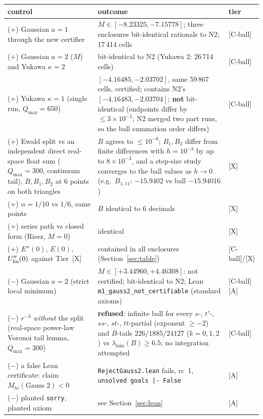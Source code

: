 \documentclass[11pt]{article}
\newcommand{\tier}[1]{\textsf{[#1]}}
\newcommand{\tA}{\tier{A}}
\newcommand{\tCb}{\tier{C-ball}}
\newcommand{\tX}{\tier{X}}
\newcommand{\lean}[1]{\texttt{#1}}
\begin{document}
\begin{center}\small\setlength{\tabcolsep}{3pt}\begin{tabular}{p{4.6cm}p{6.6cm}p{1.5cm}}\toprule
control & outcome & tier\\\midrule
(+) Gaussian $a=1$ through the new certifier & $M\in[-8.23325,-7.15778]$; three enclosures bit-identical rationals to N2; 17\,414 cells & \tCb\\
(+) Gaussian $a=2$ ($M$) and Yukawa $\kappa=2$ & bit-identical to N2 (Yukawa 2: 26\,714 cells) & \tCb\\
(+) Yukawa $\kappa=1$ (single run, $Q_{\max}=650$) & $[-4.16485,-2.03702]$, same 59\,867 cells, certified; contains N2's $[-4.16483,-2.03704]$; \textbf{not} bit-identical (endpoints differ by $\le3\times10^{-5}$; N2 merged two part runs, so the ball summation order differs) & \tCb\\
(+) Ewald split vs an independent direct real-space float sum ($Q_{\max}=300$, continuum tail), $B,B_1,B_2$ at $6$ points on both triangles & $B$ agrees to $\le10^{-6}$; $B_1,B_2$ differ from finite differences with $h=10^{-3}$ by up to $8\times10^{-3}$, and a step-size study converges to the ball values as $h\to0$ (e.g.\ $B_{1,11}$: $-15.9402$ vs ball $-15.94016$) & \tX\\
(+) $\alpha=1/10$ vs $1/6$, same points & $B$ identical to 6 decimals & \tX\\
(+) series path vs closed form (Riesz, $M=0$) & identical & \tX\\
(+) $E''(0)$, $E(0)$, $U_{\rm lin}''(0)$ against Tier~\tX{} & contained in all enclosures (Section~\ref{sec:table}) & \tCb/\tX\\
($-$) Gaussian $a=2$ (strict local minimum) & $M\in[+3.44960,+4.46308]$: not certified; bit-identical to N2; Lean \lean{m1\_gauss2\_not\_certifiable} (standard axioms) & \tCb\,\tA\\
($-$) $r^{-3}$ \emph{without} the split (real-space power-law Voronoi tail lemma, $Q_{\max}=300$) & \textbf{refused}: infinite ball for every $s$-, $t'$-, $ss$-, $st$-, $tt$-partial (exponent $\ge-2$) and $B$-tails $226/1885/24127$ ($k=0,1,2$) vs $\lambda_{\min}(B)\ge6.5$; no integration attempted & \tCb\\
($-$) a false Lean certificate: claim $M_{hi}(\text{Gauss }2)<0$ & \texttt{RejectGauss2.lean} fails, rc~1, \lean{unsolved goals |- False} & \tA\\
($-$) planted \lean{sorry}, planted axiom & see Section~\ref{sec:lean} & \tA\\
\bottomrule\end{tabular}\end{center}
\end{document}

